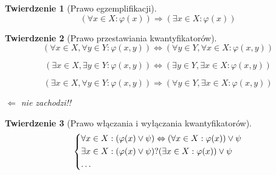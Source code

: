 \documentclass[a5paper,8pt]{article}
\newtheorem{theorem}{Twierdzenie}[section]
\begin{document}
            \begin{theorem}[Prawo egzemplifikacji]
                \begin{equation*}
                    ( \forall x \in X : \varphi(x) ) \Rightarrow ( \exists x \in X : \varphi(x) )
                \end{equation*}
            \end{theorem}

            \begin{theorem}[Prawo przestawiania kwantyfikatorów]

                \begin{equation*}
                    (\forall x \in X, \forall y \in Y : \varphi(x, y)) \Leftrightarrow ( \forall y \in Y, \forall x \in X : \varphi(x, y))
                \end{equation*}

                \begin{equation*}
                    (\exists x \in X, \exists y \in Y : \varphi(x, y)) \Leftrightarrow ( \exists y \in Y, \exists x \in X : \varphi(x, y))
                \end{equation*}

                \begin{equation*}
                    (\exists x \in X, \forall y \in Y : \varphi(x, y)) \Rightarrow ( \forall y \in Y, \exists x \in X : \varphi(x, y))
                \end{equation*}

                \begin{center}
                    $ \Leftarrow $ nie zachodzi!!
                \end{center}

            \end{theorem}

            \begin{theorem}[Prawo włączania i wyłączania kwantyfikatorów]

                \[
                    \begin{dcases*}
                    \forall x \in X : (\varphi(x) \vee \psi) \Leftrightarrow (\forall x \in X : \varphi(x)) \vee \psi \\
                    \exists x \in X : (\varphi(x) \vee \psi) ? (\exists x \in X : \varphi(x)) \vee \psi \\
                    \ldots
                    \end{dcases*}
                \]

            \end{theorem}
\end{document}
